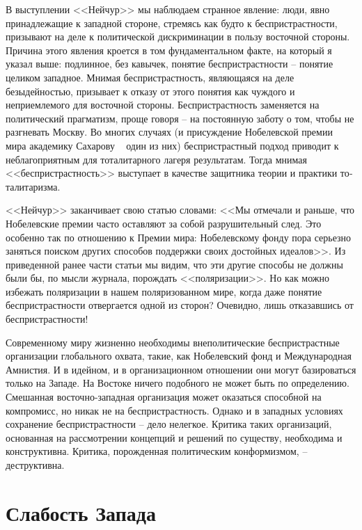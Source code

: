 \documentclass{book}
\begin{document}
В выступлении <<Нейчур>> мы наблюдаем странное явление: люди, явно принадлежащие к западной стороне, стремясь как будто к беспристрастности, призывают на деле к политиче­ской дискриминации в пользу восточной стороны. Причина этого явления кроется в том фундаментальном факте, на кото­рый я указал выше: подлинное, без кавычек, понятие бесприст­растности -- понятие целиком западное. Мнимая беспристраст­ность, являющаяся на деле безыдейностью, призывает к отказу от этого понятия как чуждого и неприемлемого для восточной стороны. Беспристрастность заменяется на политический праг­матизм, проще говоря -- на постоянную заботу о том, чтобы не разгневать Москву. Во многих случаях (и присуждение Но­белевской премии мира академику Сахарову ~ один из них) беспристрастный подход приводит к неблагоприятным для тоталитарного лагеря результатам. Тогда мнимая <<беспристраст­ность>> выступает в качестве защитника теории и практики то­талитаризма.

<<Нейчур>> заканчивает свою статью словами: <<Мы отмечали и раньше, что Нобелевские премии часто оставляют за собой разрушительный след. Это особенно так по отношению к Пре­мии мира: Нобелевскому фонду пора серьезно заняться поис­ком других способов поддержки своих достойных идеалов>>. Из приведенной ранее части статьи мы видим, что эти другие способы не должны были бы, по мысли журнала, порождать <<поляризации>>. Но как можно избежать поляризации в нашем поляризованном мире, когда даже понятие беспристрастности отвергается одной из сторон? Очевидно, лишь отказавшись от беспристрастности!

Современному миру жизненно необходимы внеполитические беспристрастные организации глобального охвата, такие, как Нобелевский фонд и Международная Амнистия. И в идей­ном, и в организационном отношении они могут базироваться только на Западе. На Востоке ничего подобного не может быть по определению. Смешанная восточно-западная организация мо­жет оказаться способной на компромисс, но никак не на бес­пристрастность. Однако и в западных условиях сохранение бес­пристрастности -- дело нелегкое. Критика таких организаций, основанная на рассмотрении концепций и решений по существу, необходима и конструктивна. Критика, порожденная политическим конформизмом, -- деструктивна.



\section{Слабость Запада}
\end{document}
